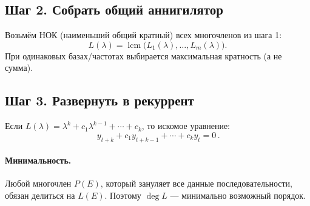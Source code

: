 \subsection*{Шаг 2. Собрать общий аннигилятор}
Возьмём НОК (наименьший общий кратный) всех многочленов из шага 1:
\[
 L(\lambda)=\operatorname{lcm}\big(L_1(\lambda),\ldots,L_m(\lambda)\big).
\]
При одинаковых базах/частотах выбирается максимальная кратность (а не сумма).

\subsection*{Шаг 3. Развернуть в рекуррент}
Если $L(\lambda)=\lambda^k+c_1\lambda^{k-1}+\cdots+c_k$, то искомое уравнение:
\[
 \boxed{\,y_{t+k}+c_1 y_{t+k-1}+\cdots+c_k y_t=0\,}.
\]

\paragraph{Минимальность.}
Любой многочлен $P(E)$, который зануляет все данные последовательности, обязан делиться на $L(E)$. Поэтому $\deg L$ — минимально возможный порядок.

\bigskip

\begin{center}
\end{center}

